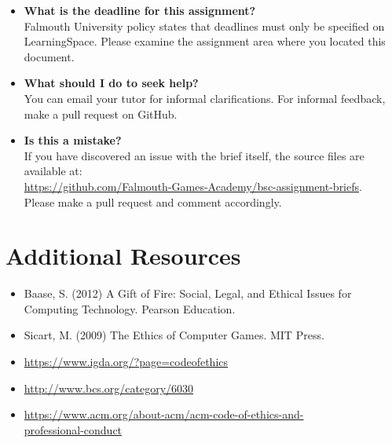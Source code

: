 \documentclass{../fal_assignment}
\begin{document}
\begin{itemize}
	\item 	\textbf{What is the deadline for this assignment?} \\ 
    		Falmouth University policy states that deadlines must only be specified on LearningSpace. Please examine the assignment area where you located this document.
    		
	\item 	\textbf{What should I do to seek help?} \\ 
    		You can email your tutor for informal clarifications. For informal feedback, make a pull request on GitHub. 
    		
    	\item 	\textbf{Is this a mistake?} \\ 	
    		If you have discovered an issue with the brief itself, the source files are available at: \\
    		\url{https://github.com/Falmouth-Games-Academy/bsc-assignment-briefs}.\\
    		 Please make a pull request and comment accordingly.
\end{itemize}

\section*{Additional Resources}

\begin{itemize}
    \item Baase, S. (2012) A Gift of Fire: Social, Legal, and Ethical Issues for Computing Technology. Pearson Education.
    \item Sicart, M. (2009) The Ethics of Computer Games. MIT Press.
    \item \url{https://www.igda.org/?page=codeofethics}
    \item \url{http://www.bcs.org/category/6030}
    \item \url{https://www.acm.org/about-acm/acm-code-of-ethics-and-} \\ \url{professional-conduct}
\end{itemize}
\end{document}
